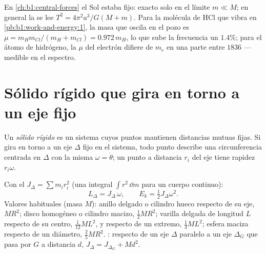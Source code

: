 \begin{example}\label{ex:b1:systems-of-points:reduced}
En \cref{ch:b1:central-forces} el Sol estaba fijo: exacto solo en el
límite $m \ll M$; en general la  se lee $T^2 = 4\pi^2a^3/G(M +
m)$. Para la molécula de HCl que vibra en \cref{pb:b1:work-and-energy:1},
la masa que oscila en el pozo es $\mu = m_Hm_{Cl}/(m_H + m_{Cl}) =
0.972\,m_H$, lo que sube la frecuencia un $1.4\%$; para el átomo de
hidrógeno, la $\mu$ del electrón difiere de $m_e$ en una parte entre
$1836$ --- medible en el espectro.
\end{example}

\section{Sólido rígido que gira en torno a un eje fijo}

\begin{definition}\label{def:b1:systems-of-points:solid}
Un \emph{sólido rígido} es un sistema cuyos puntos mantienen distancias
mutuas fijas. Si gira en torno a un eje $\Delta$ fijo en el sistema, todo
punto describe una circunferencia centrada en $\Delta$ con la misma
 $\omega = \dot\theta$; un punto a distancia $r_i$ del eje
tiene rapidez $r_i\omega$.
\end{definition}

\begin{proposition}\label{prop:b1:systems-of-points:inertia}
Con el \emph{} $J_\Delta = \sum m_ir_i^2$ (una integral
$\int r^2\,\dd m$ para un cuerpo continuo):
\[
L_\Delta = J_\Delta\,\omega, \qquad E_k = \tfrac12 J_\Delta\omega^2 .
\]
Valores habituales (masa $M$): anillo delgado o cilindro hueco respecto de
su eje, $MR^2$; disco homogéneo o cilindro macizo, $\tfrac12 MR^2$; varilla
delgada de longitud $L$ respecto de su centro, $\tfrac{1}{12}ML^2$, y
respecto de un extremo, $\tfrac13 ML^2$; esfera maciza respecto de un
diámetro, $\tfrac25 MR^2$. \emph{}: respecto de un eje
$\Delta$ paralelo a un eje $\Delta_G$ que pasa por $G$ a distancia $d$,
$J_\Delta = J_{\Delta_G} + Md^2$.
\end{proposition}

